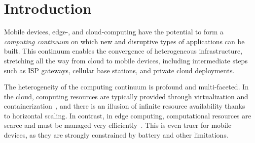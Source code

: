 \section{Introduction}
\label{sec:intro}

Mobile devices, edge-, and cloud-computing have the potential to form a \textit{computing continuum} on which new and disruptive types of applications can be built. This continuum enables the 
convergence of heterogeneous infrastructure, stretching all the way from cloud
to mobile devices, including intermediate steps such as ISP gateways, cellular base stations, and private cloud deployments.

The heterogeneity of the computing continuum is profound and multi-faceted. In the cloud, computing resources are typically provided through virtualization and containerization~\cite{leitner2016patterns, Quatrocchi2016discrete}, and there is an illusion of infinite resource availability thanks to horizontal scaling. In contrast, in edge computing, computational resources are scarce and must be managed very efficiently~\cite{Shi:2016, GarrigaMendonca2017}. This is even truer for mobile devices, as they are strongly constrained by battery and other limitations. 



